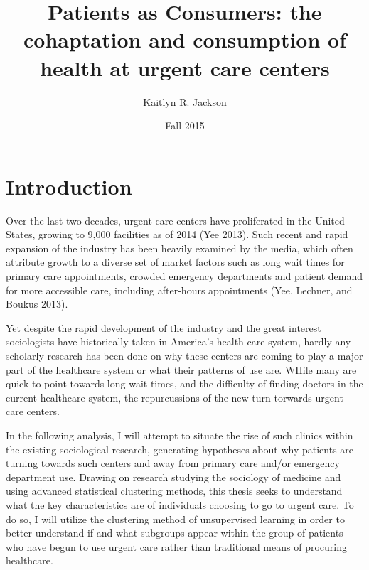 \documentclass[12pt,twoside]{reedthesis}
\title{Patients as Consumers: the cohaptation and consumption of health at
urgent care centers}
\author{Kaitlyn R. Jackson}
\date{Fall 2015}
\begin{document}
      \maketitle
  
  \frontmatter %
  \pagestyle{empty} %

  
  

      \hypersetup{linkcolor=black}
    \setcounter{tocdepth}{2}
    \tableofcontents
  
  
  
  
  
  \mainmatter %
  \pagestyle{fancyplain} %

  \chapter*{Introduction}\label{introduction}
  
  \doublespacing
  
  Over the last two decades, urgent care centers have proliferated in the
  United States, growing to 9,000 facilities as of 2014 (Yee 2013). Such
  recent and rapid expansion of the industry has been heavily examined by
  the media, which often attribute growth to a diverse set of market
  factors such as long wait times for primary care appointments, crowded
  emergency departments and patient demand for more accessible care,
  including after-hours appointments (Yee, Lechner, and Boukus 2013).
  
  Yet despite the rapid development of the industry and the great interest
  sociologists have historically taken in America's health care system,
  hardly any scholarly research has been done on why these centers are
  coming to play a major part of the healthcare system or what their
  patterns of use are. WHile many are quick to point towards long wait
  times, and the difficulty of finding doctors in the current healthcare
  system, the repurcussions of the new turn torwards urgent care centers.
  
  In the following analysis, I will attempt to situate the rise of such
  clinics within the existing sociological research, generating hypotheses
  about why patients are turning towards such centers and away from
  primary care and/or emergency department use. Drawing on research
  studying the sociology of medicine and using advanced statistical
  clustering methods, this thesis seeks to understand what the key
  characteristics are of individuals choosing to go to urgent care. To do
  so, I will utilize the clustering method of unsupervised learning in
  order to better understand if and what subgroups appear within the group
  of patients who have begun to use urgent care rather than traditional
  means of procuring healthcare.
  
\end{document}
